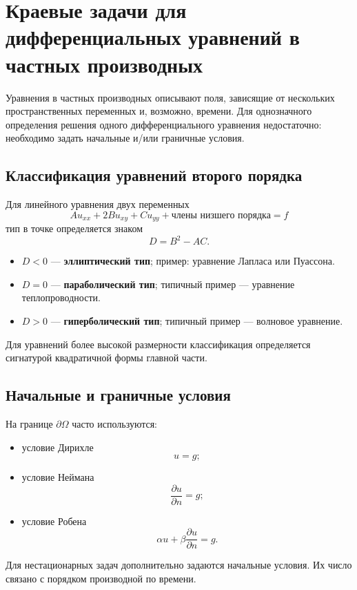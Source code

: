 \section{Краевые задачи для дифференциальных уравнений в частных производных}
\label{sec:boundary-value-problems-for-pdes}

Уравнения в частных производных описывают поля, зависящие от нескольких
пространственных переменных и, возможно, времени. Для однозначного
определения решения одного дифференциального уравнения недостаточно:
необходимо задать начальные и/или граничные условия.

\subsection{Классификация уравнений второго порядка}

Для линейного уравнения двух переменных
\[
A u_{xx}+2B u_{xy}+C u_{yy}
+\text{члены низшего порядка}=f
\]
тип в точке определяется знаком
\[
D=B^2-AC.
\]
\begin{itemize}
    \item $D<0$ --- \textbf{эллиптический тип}; пример: уравнение Лапласа
    или Пуассона.
    \item $D=0$ --- \textbf{параболический тип}; типичный пример ---
    уравнение теплопроводности.
    \item $D>0$ --- \textbf{гиперболический тип}; типичный пример ---
    волновое уравнение.
\end{itemize}
Для уравнений более высокой размерности классификация определяется
сигнатурой квадратичной формы главной части.

\subsection{Начальные и граничные условия}

На границе $\partial\Omega$ часто используются:
\begin{itemize}
    \item условие Дирихле
    \[
    u=g;
    \]
    \item условие Неймана
    \[
    \frac{\partial u}{\partial n}=g;
    \]
    \item условие Робена
    \[
    \alpha u+\beta\frac{\partial u}{\partial n}=g.
    \]
\end{itemize}
Для нестационарных задач дополнительно задаются начальные условия. Их
число связано с порядком производной по времени.

